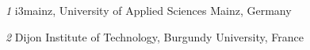 \textit{1}  i3mainz, University of Applied Sciences Mainz, Germany                                                                         

\textit{2}  Dijon Institute of Technology, Burgundy University, France